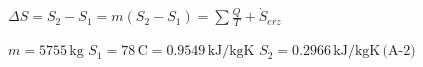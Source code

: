 \( \Delta S = S_2 - S_1 = m \left( S_2 - S_1 \right) = \sum \frac{Q}{T} + \dot{S}_{erz} \)  

\( m = 5755 \, \text{kg} \)  
\( S_1 = 78 \, \text{C} = 0.9549 \, \text{kJ/kgK} \)  
\( S_2 = 0.2966 \, \text{kJ/kgK} \, \text{(A-2)} \)